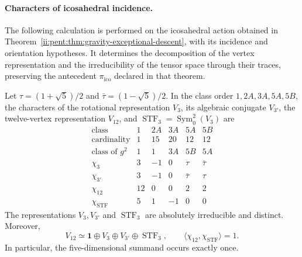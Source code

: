 \paragraph{Characters of icosahedral incidence.}
The following calculation is performed on the icosahedral action obtained in
Theorem~\ref{ii:pent:thm:gravity-exceptional-descent}, with its incidence
and orientation hypotheses. It determines the decomposition of the
vertex representation and the irreducibility of the tensor space
through their traces, preserving the antecedent
\(\pi_{\mathrm{ico}}\) declared in that theorem.

\begin{proposition}
\label{prop:ii-pent-caracteres}
Let \(\tau=(1+\sqrt5)/2\) and
\(\bar\tau=(1-\sqrt5)/2\). In the class order
\(1,2A,3A,5A,5B\), the characters of the rotational representation
\(V_3\), its algebraic conjugate \(V_{3'}\), the twelve-vertex
representation \(V_{12}\), and
\(\operatorname{STF}_3=\operatorname{Sym}^2_0(V_3)\) are
\begin{equation}
\label{eq:ii-pent-tabla-caracteres}
\begin{array}{c|rrrrr}
\text{class} &1&2A&3A&5A&5B\\ \hline
\text{cardinality}&1&15&20&12&12\\
\text{class of }g^2&1&1&3A&5B&5A\\ \hline
\chi_3&3&-1&0&\tau&\bar\tau\\
\chi_{3'}&3&-1&0&\bar\tau&\tau\\
\chi_{12}&12&0&0&2&2\\
\chi_{\mathrm{STF}}&5&1&-1&0&0
\end{array}
\end{equation}
The representations \(V_3,V_{3'}\) and
\(\operatorname{STF}_3\) are absolutely irreducible and distinct.
Moreover,
\begin{equation}
\label{eq:ii-pent-descomposicion-demostrada}
 V_{12}\simeq\mathbf1\oplus V_3\oplus V_{3'}
                  \oplus\operatorname{STF}_3,
 \qquad
 \langle\chi_{12},\chi_{\mathrm{STF}}\rangle=1.
\end{equation}
In particular, the five-dimensional summand occurs exactly once.
\end{proposition}

